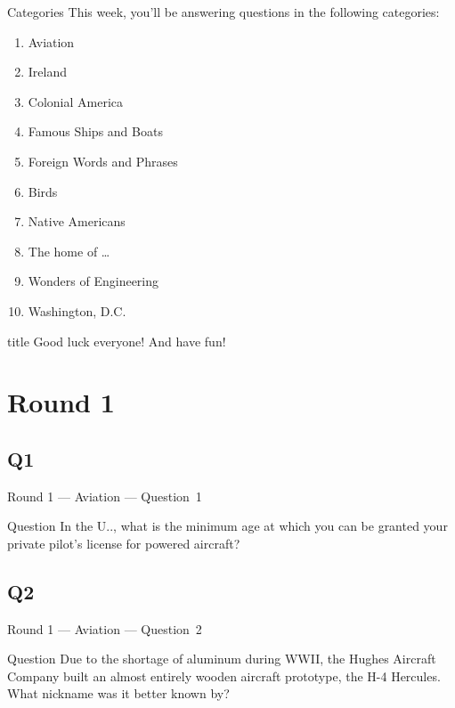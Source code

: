 \documentclass[11pt]{beamer}
\begin{document}
\begingroup{}
\begin{frame}[t]{Categories}
This week, you'll be answering questions in the following categories:
\begin{enumerate}
\item Aviation
\item Ireland
\item Colonial America
\item Famous Ships and Boats
\item Foreign Words and Phrases
\item Birds
\item Native Americans
\item The home of \ldots{}
\item Wonders of Engineering
\item Washington, D.C.
\end{enumerate}
\end{frame}
\endgroup{}

\begingroup{}
\begin{frame}
\vfill{}
\begin{beamercolorbox}[sep=8pt,center,shadow=true,rounded=true]{title}
Good luck everyone! And have fun!
\end{beamercolorbox}
\vfill{}
\end{frame}
\endgroup{}
\def\thisSectionName{Aviation}
\section{Round 1}
\subsection*{Q1}
\begin{frame}[t]{Round 1 --- Aviation --- \mbox{Question 1}}
\vspace{-0.5em}
\begin{block}{Question}
In the U.\@S.\@, what is the minimum age at which you can be granted your private pilot's license for powered aircraft?
\end{block}
\end{frame}
\subsection*{Q2}
\begin{frame}[t]{Round 1 --- Aviation --- \mbox{Question 2}}
\vspace{-0.5em}
\begin{block}{Question}
Due to the shortage of aluminum during WWII, the Hughes Aircraft Company built an almost entirely wooden aircraft prototype, the H-4 Hercules. What nickname was it better known by?
\end{block}
\end{frame}
\end{document}
